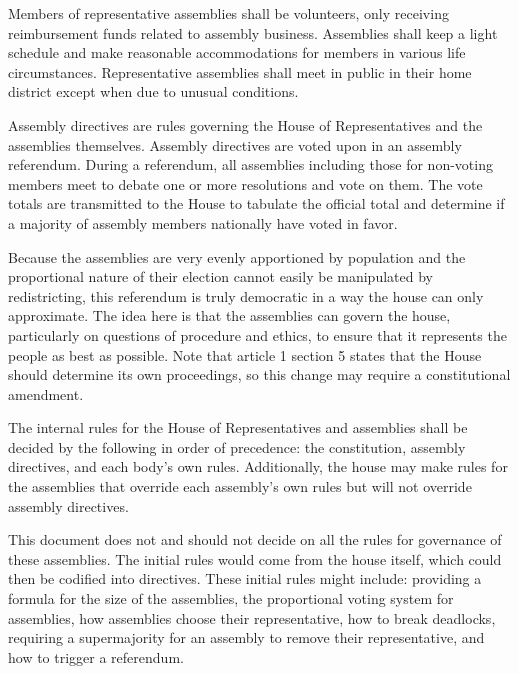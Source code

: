 \documentclass{article}
\begin{document}
\begin{quoting}
Members of representative assemblies shall be volunteers, only receiving reimbursement funds related to assembly business. Assemblies shall keep a light schedule and make reasonable accommodations for members in various life circumstances. Representative assemblies shall meet in public in their home district except when due to unusual conditions.

Assembly directives are rules governing the House of Representatives and the assemblies themselves. Assembly directives are voted upon in an assembly referendum. During a referendum, all assemblies including those for non-voting members meet to debate one or more resolutions and vote on them. The vote totals are transmitted to the House to tabulate the official total and determine if a majority of assembly members nationally have voted in favor.
\end{quoting}

Because the assemblies are very evenly apportioned by population and the proportional nature of their election cannot easily be manipulated by redistricting, this referendum is truly democratic in a way the house can only approximate. The idea here is that the assemblies can govern the house, particularly on questions of procedure and ethics, to ensure that it represents the people as best as possible. Note that article 1 section 5 states that the House should determine its own proceedings, so this change may require a constitutional amendment.

\begin{quoting}
The internal rules for the House of Representatives and assemblies shall be decided by the following in order of precedence: the constitution, assembly directives, and each body’s own rules. Additionally, the house may make rules for the assemblies that override each assembly’s own rules but will not override assembly directives.
\end{quoting}

This document does not and should not decide on all the rules for governance of these assemblies. The initial rules would come from the house itself, which could then be codified into directives. These initial rules might include: providing a formula for the size of the assemblies, the proportional voting system for assemblies, how assemblies choose their representative, how to break deadlocks, requiring a supermajority for an assembly to remove their representative, and how to trigger a referendum.
\end{document}
